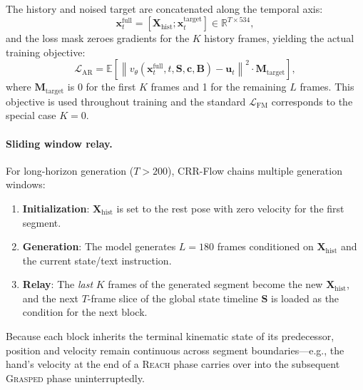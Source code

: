 \documentclass[sigconf, screen, review, anonymous]{acmart}
\begin{document}
The history and noised target are concatenated along the temporal axis:
\begin{equation}
    \mathbf{x}_t^{\text{full}} = [\mathbf{X}_{\text{hist}}; \mathbf{x}_t^{\text{target}}] \in \mathbb{R}^{T \times 534},
    \label{eq:autoreg_concat}
\end{equation}
and the loss mask zeroes gradients for the $K$ history frames, yielding the actual training objective:
\begin{equation}
    \mathcal{L}_{\text{AR}} = \mathbb{E}\left[\left\| v_\theta(\mathbf{x}_t^{\text{full}}, t, \mathbf{S}, \mathbf{c}, \mathbf{B}) - \mathbf{u}_t \right\|^2 \cdot \mathbf{M}_{\text{target}}\right],
    \label{eq:autoreg_loss}
\end{equation}
where $\mathbf{M}_{\text{target}}$ is 0 for the first $K$ frames and 1 for the remaining $L$ frames. This objective is used throughout training and the standard $\mathcal{L}_{\text{FM}}$ corresponds to the special case $K{=}0$.

\paragraph{Sliding window relay.}
For long-horizon generation ($T > 200$), CRR-Flow chains multiple generation windows:
\begin{enumerate}
    \item \textbf{Initialization}: $\mathbf{X}_{\text{hist}}$ is set to the rest pose with zero velocity for the first segment.
    \item \textbf{Generation}: The model generates $L{=}180$ frames conditioned on $\mathbf{X}_{\text{hist}}$ and the current state/text instruction.
    \item \textbf{Relay}: The \emph{last} $K$ frames of the generated segment become the new $\mathbf{X}_{\text{hist}}$, and the next $T$-frame slice of the global state timeline $\mathbf{S}$ is loaded as the condition for the next block.
\end{enumerate}
Because each block inherits the terminal kinematic state of its predecessor, position and velocity remain continuous across segment boundaries---e.g., the hand's velocity at the end of a \textsc{Reach} phase carries over into the subsequent \textsc{Grasped} phase uninterruptedly.
\end{document}
